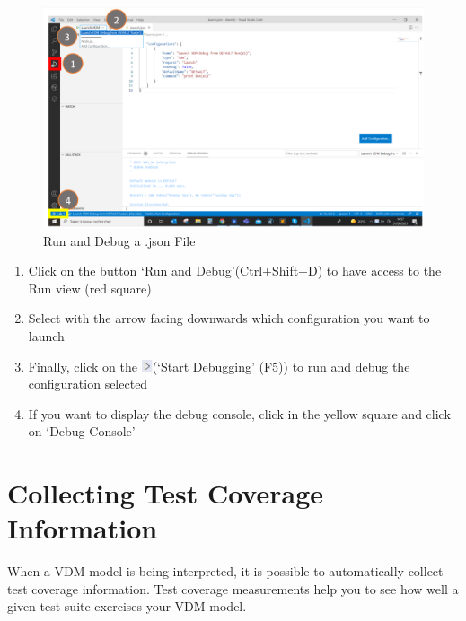 \documentclass{overturerepchap}
\begin{document}
\begin{figure}[htp]
\begin{center}
  \includegraphics[width=460px]{snapshots/Run and Debug a .json file.PNG}
  \caption[Run view]{Run and Debug a .json File}
  \label{fig:userguide:DebuggingVDM}
\end{center}
\end{figure}



\begin{enumerate}
    \item Click on the button ‘Run and Debug’(Ctrl+Shift+D) to have access to the Run view (red square)
    \item Select with the arrow facing downwards which configuration you want to launch
    \item Finally, click on the \includegraphics[width=0.025\textwidth]{snapshots/Icon Start Debugging.png}(‘Start Debugging’ (F5)) to run and debug the configuration selected
    \item If you want to display the debug console, click in the yellow square and click on ‘Debug Console’
\end{enumerate}


\chapter{Collecting Test Coverage Information}\label{sec:testcoverage}

When a VDM model is being interpreted, it is possible to automatically collect
test coverage information. Test coverage measurements help you to see how well a
given test suite exercises your VDM model.
\end{document}
